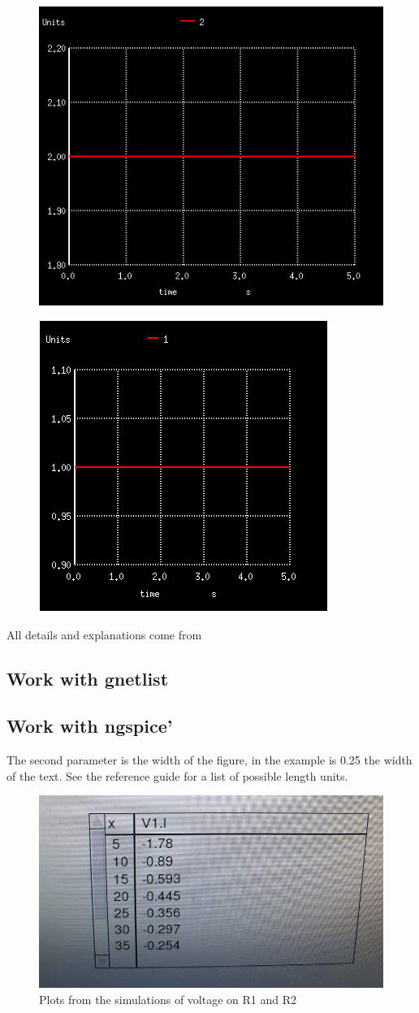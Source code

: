 \documentclass{report}
\begin{document}
 
 \begin{figure}[b]
\centering
\begin{minipage}{.5\textwidth}
  \centering
  \includegraphics[width=.4\linewidth]{Figures/oneFig.png}
  \label{fig:test8}
\end{minipage}%
\begin{minipage}{.5\textwidth}
  \centering
  \includegraphics[width=.4\linewidth]{Figures/twoFig.png}
  \label{fig:test7}
\end{minipage}
\end{figure}

All details and explanations come from \cite{firstRef,thirdRef}




\subsection{ Work with gnetlist}
 

 
\subsection{Work with ngspice’}
 The second parameter is the width of the figure, in the example is 0.25 the width of the text. See the reference guide for a list of possible length units.\cite{firstRef,thirdRef}
 
 \begin{figure}[ht]
 \centering
\includegraphics[width=0.6\linewidth]{Figures/figure_4_.jpg} 
\caption{Plots from the simulations of voltage on R1 and R2}
\label{fig:figure5}
\end{figure}
\end{document}
